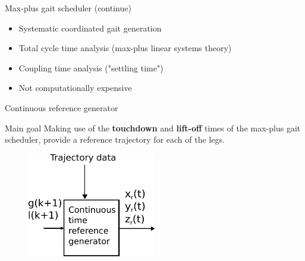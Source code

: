 \documentclass[10pt]{beamer}
\begin{document}
\begin{frame}{Max-plus gait scheduler (continue)}
\begin{itemize}
	\setlength\itemsep{3em}
	\item Systematic coordinated gait generation 
	\item Total cycle time analysis (max-plus linear systems theory)
	\item Coupling time analysis ("settling time")
	\item Not computationally expensive
\end{itemize}	
\end{frame}

\begin{frame}{Continuous reference generator}
	\begin{block}{Main goal}
		\Large Making use of the \textbf{touchdown} and \textbf{lift-off} times of the max-plus gait scheduler, provide a reference trajectory for each of the legs.
	\end{block}
	\begin{figure}[H]
		\includegraphics[width=0.5\textwidth]{AngularFrequency.pdf}
	\end{figure}
\end{frame}
\end{document}
